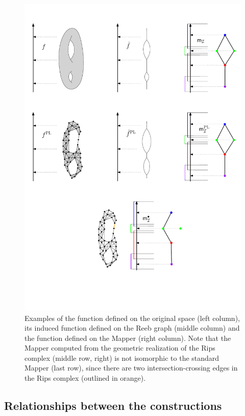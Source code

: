 \begin{figure}\centering
\includegraphics[width=15cm]{figures/FunctionRecap}
\caption[Functions on Mapper]{\label{fig:recap}
Examples of the function defined on the original space (left column), its induced function defined on the Reeb graph (middle column) and 
the function defined on the Mapper (right column).
Note that the Mapper computed from the geometric realization of the Rips complex (middle row, right)
is not isomorphic to the standard Mapper (last row), since there are two intersection-crossing edges
in the Rips complex (outlined in orange).}
\end{figure}


\subsection{Relationships between the constructions}
\label{sec:approx-mapper}

